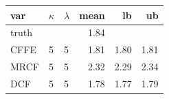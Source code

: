 \begin{tabular}{lllrrr}
  \hline
var & $\kappa$ & $\lambda$ & mean & lb & ub \\ 
  \hline
truth &  &  & 1.84 &  &  \\ 
  CFFE  & 5 & 5 & 1.81 & 1.80 & 1.81 \\ 
  MRCF  & 5 & 5 & 2.32 & 2.29 & 2.34 \\ 
  DCF  & 5 & 5 & 1.78 & 1.77 & 1.79 \\ 
   \hline
\end{tabular}
